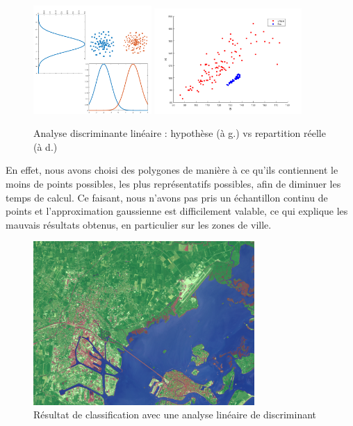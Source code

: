 \documentclass[a4paper,10pt]{article}
\begin{document}
\begin{figure}[H]
  \centering
    \includegraphics[width=0.4\textwidth]{ml_lda}\hfill
    \includegraphics[width=0.5\textwidth]{ml_ldaReel}
  \caption{Analyse discriminante linéaire : hypothèse (à g.) vs repartition réelle (à d.)}
  \label{fig:ml_lda}
\end{figure}

  En effet, nous avons choisi des polygones de manière à ce qu'ils contiennent le moins de points possibles, les plus représentatifs possibles, afin de diminuer les temps de calcul. Ce faisant, nous n'avons pas pris un échantillon continu de points et l'approximation gaussienne est difficilement valable, ce qui explique les mauvais résultats obtenus, en particulier sur les zones de ville.
\begin{figure}[H]
  \centering
    \includegraphics[width=0.75\textwidth]{venise+LDA}
  \caption{Résultat de classification avec une analyse linéaire de discriminant}
  \label{fig:veniseLDA}
\end{figure}
\end{document}
